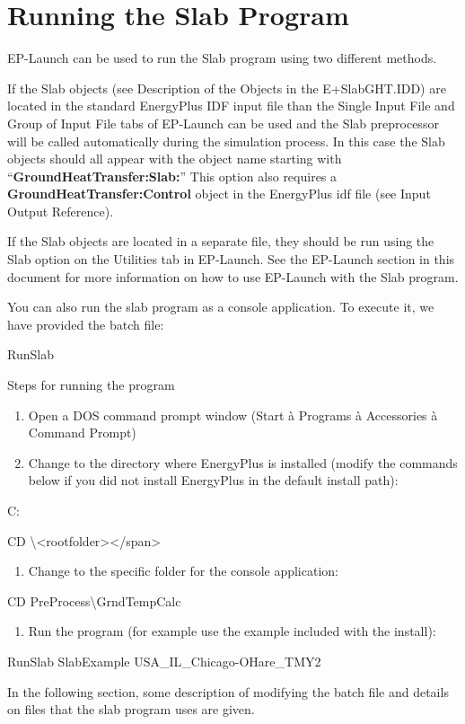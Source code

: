 \section{Running the Slab Program}\label{running-the-slab-program}

EP-Launch can be used to run the Slab program using two different methods.

If the Slab objects (see Description of the Objects in the E+SlabGHT.IDD) are located in the standard EnergyPlus IDF input file than the Single Input File and Group of Input File tabs of EP-Launch can be used and the Slab preprocessor will be called automatically during the simulation process. In this case the Slab objects should all appear with the object name starting with ``\textbf{GroundHeatTransfer:Slab:}'' This option also requires a \textbf{GroundHeatTransfer:Control} object in the EnergyPlus idf file (see Input Output Reference).

If the Slab objects are located in a separate file, they should be run using the Slab option on the Utilities tab in EP-Launch. See the EP-Launch section in this document for more information on how to use EP-Launch with the Slab program.

You can also run the slab program as a console application. To execute it, we have provided the batch file:

RunSlab

Steps for running the program

\begin{enumerate}
\def\labelenumi{\arabic{enumi})}
\item
  Open a DOS command prompt window (Start à Programs à Accessories à Command Prompt)
\item
  Change to the directory where EnergyPlus is installed (modify the commands below if you did not install EnergyPlus in the default install path):
\end{enumerate}

C:

CD \textbackslash{}\textless{}rootfolder\textgreater{}\textless{}/span\textgreater{}

\begin{enumerate}
\def\labelenumi{\arabic{enumi})}
\setcounter{enumi}{2}
\tightlist
\item
  Change to the specific folder for the console application:
\end{enumerate}

CD PreProcess\textbackslash{}GrndTempCalc

\begin{enumerate}
\def\labelenumi{\arabic{enumi})}
\setcounter{enumi}{3}
\tightlist
\item
  Run the program (for example use the example included with the install):
\end{enumerate}

RunSlab SlabExample USA\_IL\_Chicago-OHare\_TMY2

In the following section, some description of modifying the batch file and details on files that the slab program uses are given.
